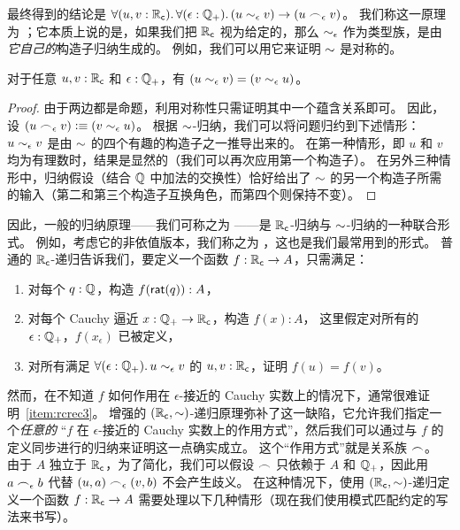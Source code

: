 最终得到的结论是 $\fall{u,v:\RC}{\epsilon:\Qp} (u\close\epsilon v) \to (u \bsim_\epsilon v)$。
我们称这一原理为 ；它本质上说的是，如果我们把 $\mathbb{R}_\mathsf{c}$ 视为给定的，那么 $\sim_{\epsilon}$ 作为类型族，是由\emph{它自己的}构造子归纳生成的。
例如，我们可以用它来证明 $\mathord\sim$ 是对称的。

\begin{lem}\label{thm:RCsim-symmetric}
  对于任意 $u,v:\mathbb{R}_\mathsf{c}$ 和 $\epsilon:\mathbb{Q}_{+}$，有 $(u\sim_{\epsilon} v) = (v\sim_{\epsilon} u)$。
\end{lem}

\begin{proof}
  由于两边都是命题，利用对称性只需证明其中一个蕴含关系即可。
  因此，设 $(u\frown_\epsilon v) \vcentcolon\equiv (v\sim_{\epsilon} u)$。
  根据 $\mathord\sim$-归纳，我们可以将问题归约到下述情形：$u\sim_{\epsilon} v$ 是由 $\mathord\sim$ 的四个有趣的构造子之一推导出来的。
  在第一种情形，即 $u$ 和 $v$ 均为有理数时，结果是显然的（我们可以再次应用第一个构造子）。
  在另外三种情形中，归纳假设（结合 $\mathbb{Q}$ 中加法的交换性）恰好给出了 $\mathord\sim$ 的另一个构造子所需的输入（第二和第三个构造子互换角色，而第四个则保持不变）。
\end{proof}

因此，一般的归纳原理——我们可称之为 ——是 $\mathbb{R}_\mathsf{c}$-归纳与 $\mathord\sim$-归纳的一种联合形式。
例如，考虑它的非依值版本，我们称之为 ，这也是我们最常用到的形式。
%
普通的 $\mathbb{R}_\mathsf{c}$-递归告诉我们，要定义一个函数 $f : \mathbb{R}_\mathsf{c} \to A$，只需满足：

\begin{enumerate}
\item 对每个 $q : \mathbb{Q}$，构造 $f(\mathsf{rat}(q)) : A$，
\item 对每个 Cauchy 逼近 $x : \mathbb{Q}_{+} \to \mathbb{R}_\mathsf{c}$，构造 $f(x) : A$，
  这里假定对所有的 $\epsilon : \mathbb{Q}_{+}$，$f(x_\epsilon)$ 已被定义，
\item 对所有满足 $\fall{\epsilon:\Qp} u\close\epsilon v$ 的 $u, v : \mathbb{R}_\mathsf{c}$，证明 $f(u) = f(v)$。\label{item:rcrec3}
\end{enumerate}

然而，在不知道 $f$ 如何作用在 $\epsilon$-接近的 Cauchy 实数上的情况下，通常很难证明~\ref{item:rcrec3}。
增强的 $(\mathbb{R}_\mathsf{c},\mathord\sim)$-递归原理弥补了这一缺陷，它允许我们指定一个\emph{任意的} ``$f$ 在 $\epsilon$-接近的 Cauchy 实数上的作用方式''，然后我们可以通过与 $f$ 的定义同步进行的归纳来证明这一点确实成立。
这个``作用方式''就是关系族 $\frown$。
由于 $A$ 独立于 $\mathbb{R}_\mathsf{c}$，为了简化，我们可以假设 $\frown$ 只依赖于 $A$ 和 $\mathbb{Q}_{+}$，因此用 $a\frown_\epsilon b$ 代替 $(u,a) \frown_\epsilon (v,b)$ 不会产生歧义。
在这种情况下，使用 $(\mathbb{R}_\mathsf{c},\mathord\sim)$-递归定义一个函数 $f:\mathbb{R}_\mathsf{c}\to A$ 需要处理以下几种情形（现在我们使用模式匹配约定的写法来书写）。

